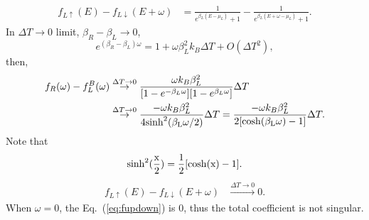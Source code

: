 \documentclass[aps,prb,superscriptaddress]{revtex4-2}
\begin{document}
\begin{equation}\label{eq:fupdown}
\begin{split}
f_{L\uparrow}(E)-f_{L\downarrow}(E+\omega) &= \frac{1}{e^{\beta_{L}(E-\mu_{L})}+1} - \frac{1}{e^{\beta_{L}(E+\omega-\mu_{L})}+1}.
\end{split}
\end{equation}
In $\Delta T\to 0$ limit, $\beta_{R}-\beta_{L} \to 0$,
\begin{equation}
e^{(\beta_{R}-\beta_{L})\omega} = 1 + \omega\beta_{L}^{2} k_{B}\Delta T + O(\Delta T^{2}),
\end{equation}
then,
\begin{equation}
\begin{split}
f_{R}(\omega)-f_{L}^{B}(\omega) &\stackrel{\Delta T\to 0}{\rightarrow}  \frac{\omega k_{B}\beta_{L}^{2} } {[ 1 - e^{-\beta_{L}\omega}] [1-e^{\beta_{L} \omega}]}\Delta T \\
& \stackrel{\Delta T\to 0}{\rightarrow} \frac{-\omega k_{B}\beta_{L}^{2}} {4\rm{sinh}^2(\beta_{L}\omega/2)}\Delta T  = \frac{-\omega k_{B}\beta_{L}^{2}} {2[\rm{cosh}(\beta_{L}\omega)-1]}\Delta T.
\end{split}
\end{equation}
Note that
\[
\rm{sinh}^2(\frac{x}{2}) = \frac{1}{2}[\rm{cosh}(x)-1].
\]
\begin{equation}\label{eq:fupdown}
\begin{split}
f_{L\uparrow}(E)-f_{L\downarrow}(E+\omega) & \stackrel{\Delta T\to 0}{\rightarrow} 0.
\end{split}
\end{equation}
When $\omega=0$, the Eq.~(\ref{eq:fupdown}) is 0, thus the total coefficient is not singular. 
\end{document}
